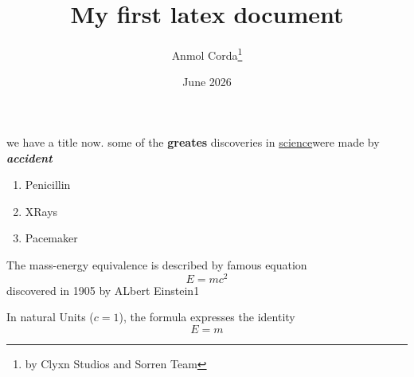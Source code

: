 \documentclass[2pt,letterpaper]{article}
\title{My first latex document}
\author{Anmol Corda\thanks{by Clyxn Studios and Sorren Team}}
\date{June 2026}
\begin{document}
\maketitle
we have a title now.
some of the \textbf{greates}
discoveries in \underline{science}were made
by \textbf{\textit{accident}}
\begin{enumerate}
	\item Penicillin
	\item XRays
	\item Pacemaker
\end{enumerate}

The mass-energy equivalence is described by famous equation
\[E=mc^2\] discovered in 1905 by ALbert Einstein1

In natural Units ($c=1$), the formula expresses the identity
\begin{equation}
	E=m
\end{equation}
\end{document}
